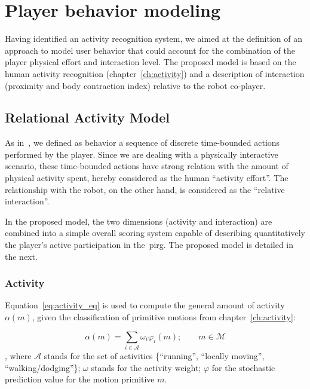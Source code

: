 \chapter{Player behavior modeling}\label{ch:modeling}

Having identified an activity recognition system, we aimed at the definition of an approach to model user behavior that could account for the combination of the player physical effort and interaction level. The proposed model is based on the human activity recognition (chapter~\ref{ch:activity}) and a description of interaction (proximity and body contraction index) relative to the robot co-player.

\section{Relational Activity Model}\label{sec:simple_model}

As in~\cite{etheredge_generic_2013}, we defined as behavior a sequence of discrete time-bounded actions performed by the player. Since we are dealing with a physically interactive scenario, these time-bounded actions have strong relation with the amount of physical activity spent, hereby considered as the human ``activity effort''. The relationship with the robot, on the other hand, is considered as the ``relative interaction''. 

In the proposed model, the two dimensions (activity and interaction) are combined into a simple overall scoring system capable of describing quantitatively the player's active participation in the~\gls{pirg}. The proposed model is detailed in the next.

\subsection{Activity}\label{activity}

Equation~\ref{eq:activity_eq} is used to compute the general amount of activity $\alpha(m)$, given the classification of primitive motions from chapter~\ref{ch:activity}:

\begin{equation}
	\alpha(m)=\sum_{i \in \mathcal{A}} \omega_{i}\varphi_i(m);\qquad m \in \mathcal{M}
	\label{eq:activity_eq}
\end{equation}
, where $\mathcal{A}$ stands for the set of activities \{``running'', ``locally moving'', ``walking/dodging''\}; $\omega$ stands for the activity weight; $\varphi$ for the stochastic prediction value for the motion primitive $m$.

